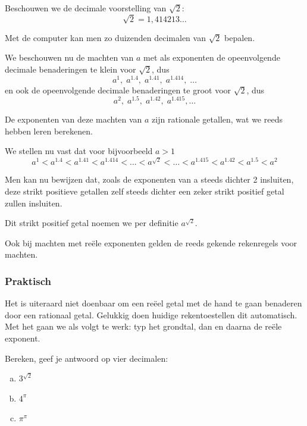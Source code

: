 \documentclass[12pt,twoside,a4paper]{article}
\begin{document}
Beschouwen we de decimale voorstelling van $\sqrt{2}$:
$$\sqrt{2} = 1,414213\ldots$$

Met de computer kan men zo duizenden decimalen van $\sqrt{2}$ bepalen.

We beschouwen nu de machten van $a$ met als exponenten de opeenvolgende
decimale benaderingen te klein voor $\sqrt{2}$, dus
$$a^1,\; a^{1.4},\; a^{1.41},\; a^{1.414},\; \ldots$$
en ook de opeenvolgende decimale benaderingen te groot voor $\sqrt{2}$, dus
$$a^2,\; a^{1.5},\; a^{1.42},\; a^{1.415}, \ldots$$

De exponenten van deze machten van $a$ zijn rationale getallen, wat we reeds hebben leren berekenen.

We stellen nu vast dat voor bijvoorbeeld $a>1$
$$a^1 < a^{1.4} < a^{1.41} < a^{1.414} < \ldots < a^{\sqrt{2}} < \ldots < a^{1.415} < a^{1.42} < a^{1.5} < a^2$$

Men kan nu bewijzen dat, zoals de exponenten van a steeds dichter 2 insluiten,
deze strikt positieve getallen zelf steeds dichter een zeker strikt positief getal zullen
insluiten.

Dit strikt positief getal noemen we per definitie $a^{\sqrt{2}}$.

Ook bij machten met reële exponenten gelden de reeds gekende rekenregels voor machten.

\subsubsection*{Praktisch}

Het is uiteraard niet doenbaar om een reëel getal met de hand te gaan benaderen door een rationaal getal. Gelukkig doen huidige rekentoestellen dit automatisch. Met het  gaan we als volgt te werk: typ het grondtal, dan  en daarna de reële exponent.

\begin{oefening}
Bereken, geef je antwoord op vier decimalen:\\
\begin{enumerate}[(a)]
  \itemsep1.5em
  \item $3^{\sqrt{2}}$
  \item $4^\pi$
  \item $\pi^\pi$
\end{enumerate}
\end{oefening}
\end{document}
